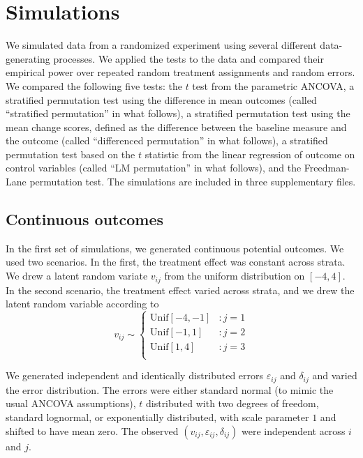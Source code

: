 \documentclass[12pt]{article}
\begin{document}
\section{Simulations}\label{sec:simulations}

We simulated data from a randomized experiment using several different data-generating processes.
We applied the tests to the data and compared their empirical power over repeated random treatment assignments and random errors.
We compared the following five tests:
the $t$ test from the parametric ANCOVA,
a stratified permutation test using the difference in mean outcomes
 (called ``stratified permutation'' in what follows),
a stratified permutation test using the mean change scores, defined as the difference between the baseline measure and the outcome (called ``differenced permutation'' in what follows),
a stratified permutation test based on the $t$ statistic from the linear regression of outcome on control variables (called ``LM permutation'' in what follows),
and the Freedman-Lane permutation test.
The simulations are included in three supplementary files.

\subsection{Continuous outcomes}

In the first set of simulations, we generated continuous potential outcomes.
We used two scenarios.
In the first, the treatment effect was constant across strata.
We drew a latent random variate $v_{ij}$ from the uniform distribution on $[-4, 4]$.
In the second scenario, the treatment effect varied across strata, and we drew the latent random variable according to
\begin{displaymath}
   v_{ij} \sim \left\{
     \begin{array}{lr}
       \text{Unif}[-4, -1] & : j=1\\
       \text{Unif}[-1, 1] & : j=2\\
       \text{Unif}[1, 4] & : j=3\\
     \end{array}
   \right.
\end{displaymath} 

We generated independent and identically distributed errors $\varepsilon_{ij}$ and $\delta_{ij}$ and varied the error distribution. 
The errors were either standard normal (to mimic the usual ANCOVA assumptions),
$t$ distributed with two degrees of freedom,
standard lognormal,
or exponentially distributed, with scale parameter $1$ and shifted to have mean zero.
The observed $(v_{ij}, \varepsilon_{ij}, \delta_{ij})$ were independent across $i$ and $j$.
\end{document}
